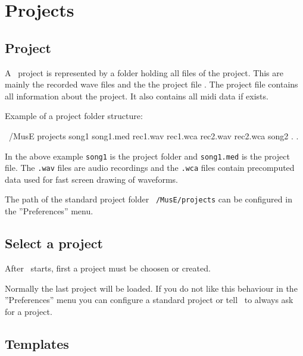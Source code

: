 \chapter{Projects}

  \section{Project}

      A \M\ project  is represented by a folder holding 
      all files of the project. This are mainly the recorded wave files 
      and the the project file .
      The project file contains all information about the project.
      It also contains all midi data if exists.

      Example of a project folder structure:

      \starttyping
      ~/MusE
            projects
                  song1             
                        song1.med
                        rec1.wav
                        rec1.wca
                        rec2.wav
                        rec2.wca
                  song2
                          .             
                          .             
      \stoptyping

      In the above example {\tt song1} is the project folder 
       and
      {\tt song1.med} is the project file. 
      The {\tt *.wav} files are audio recordings and the {\tt *.wca}
      files contain precomputed data used for fast screen drawing of
      waveforms.

      The path of the standard project folder 
        {\tt ~/MusE/projects}
      can be configured in the ''Preferences'' menu.
      

   \section{Select a project}

      After \M\ starts, first a project must be choosen or created.

      Normally the last project will be loaded. If you do not like this
      behaviour in the ''Preferences'' menu you can configure
      a standard project  or tell \M\ to
      always ask for a project.

   \section{Templates}

